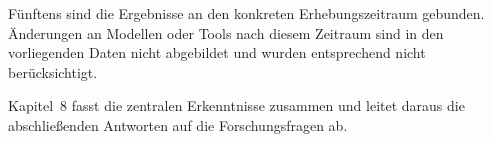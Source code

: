 F\"unftens sind die Ergebnisse an den konkreten Erhebungszeitraum gebunden.
\"Anderungen an Modellen oder Tools nach diesem Zeitraum sind in den vorliegenden Daten nicht abgebildet und wurden entsprechend nicht ber\"ucksichtigt.

Kapitel~8 fasst die zentralen Erkenntnisse zusammen und leitet daraus die abschlie\ss enden Antworten auf die Forschungsfragen ab.

\endinput
\chapter{Diskussion}
\label{chap:discussion}

\section{Zentrale Erkenntnisse dieser Studie}
\label{sec:discussion_core_findings}


